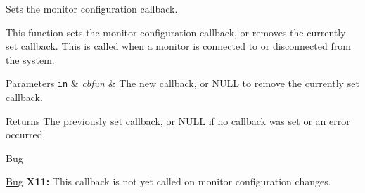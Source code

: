 Sets the monitor configuration callback. 

This function sets the monitor configuration callback, or removes the currently set callback. This is called when a monitor is connected to or disconnected from the system.


\begin{DoxyParams}[1]{Parameters}
\mbox{\tt in}  & {\em cbfun} & The new callback, or {\ttfamily N\-U\-L\-L} to remove the currently set callback. \\
\hline
\end{DoxyParams}
\begin{DoxyReturn}{Returns}
The previously set callback, or {\ttfamily N\-U\-L\-L} if no callback was set or an error occurred.
\end{DoxyReturn}
\begin{DoxyRefDesc}{Bug}
\item[\hyperlink{bug__bug000001}{Bug}]{\bfseries X11\-:} This callback is not yet called on monitor configuration changes.\end{DoxyRefDesc}
